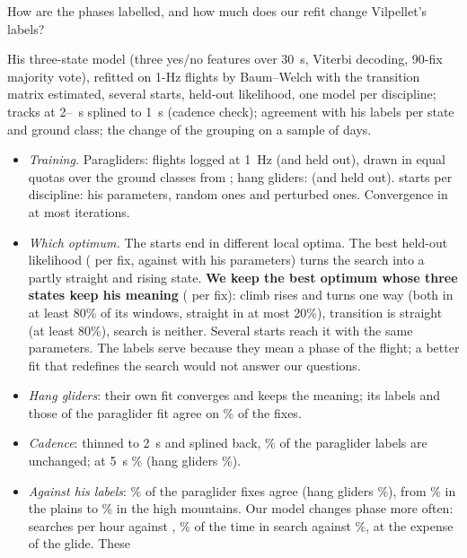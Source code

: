 \documentclass[10pt,a4paper]{article}
\newcommand{\Q}{\item[\textcolor{question}{\textbf{Q.}}]\color{question}}
\newcommand{\Res}{\item[\textcolor{answer}{\textbf{Result.}}]\color{black}}
\newcommand{\Tool}{\item[\textcolor{black}{\textbf{Tool.}}]\color{black}}
\newenvironment{step}{\begin{description}[leftmargin=0pt, itemsep=7pt, topsep=8pt]}{\end{description}}
\begin{document}
\begin{step}
\Q How are the phases labelled, and how much does our refit change Vilpellet's labels?
\Tool His three-state model (three yes/no features over 30~s, Viterbi decoding, 90-fix majority vote),
  refitted on 1-Hz flights by Baum--Welch with the transition matrix estimated, several starts, held-out
  likelihood, one model per discipline; tracks at 2--\DtMax~s splined to 1~s (cadence check); agreement with his
  labels per state and ground class; the change of the grouping on a sample of days.
\Res\mbox{}
  \begin{itemize}
  \item \emph{Training.} Paragliders: \RefitTrainPara{} flights logged at 1~Hz (and \RefitHeldPara{} held out),
    drawn in equal quotas over the ground classes from \RefitPoolPara; hang gliders: \RefitTrainHang{} (and
    \RefitHeldHang{} held out). \RefitStarts{} starts per discipline: his parameters, random ones and perturbed
    ones. Convergence in at most \RefitIterMax{} iterations.
  \item \emph{Which optimum.} The starts end in different local optima. The best held-out likelihood
    (\RefitLLBestParaFix{} per fix, against \RefitLLHisParaFix{} with his parameters) turns the search into a
    partly straight and rising state. \textbf{We keep the best optimum whose three states keep his meaning}
    (\RefitLLOursParaFix{} per fix): climb rises and turns one way (both in at least 80\% of its windows, straight
    in at most 20\%), transition is straight (at least 80\%), search is neither. Several starts reach it with the
    same parameters. The labels serve because they mean a phase of the flight; a better fit that redefines the
    search would not answer our questions.
  \item \emph{Hang gliders}: their own fit converges and keeps the meaning; its labels and those of the
    paraglider fit agree on \RefitHangVsPara\% of the fixes.
  \item \emph{Cadence}: thinned to 2~s and splined back, \RefitCadenceParaTwo\% of the paraglider labels are
    unchanged; at 5~s \RefitCadenceParaFive\% (hang gliders \RefitCadenceHangFive\%).
  \item \emph{Against his labels}: \RefitAgreePara\% of the paraglider fixes agree (hang gliders
    \RefitAgreeHang\%), from \RefitAgreePlains\% in the plains to \RefitAgreeHighMtn\% in the high mountains. Our
    model changes phase more often: \RefitSearchPerHourOurs{} searches per hour against \RefitSearchPerHourHis,
    \RefitSearchShareOurs\% of the time in search against \RefitSearchShareHis\%, at the expense of the glide. These

\end{itemize}
\end{step}
\end{document}
